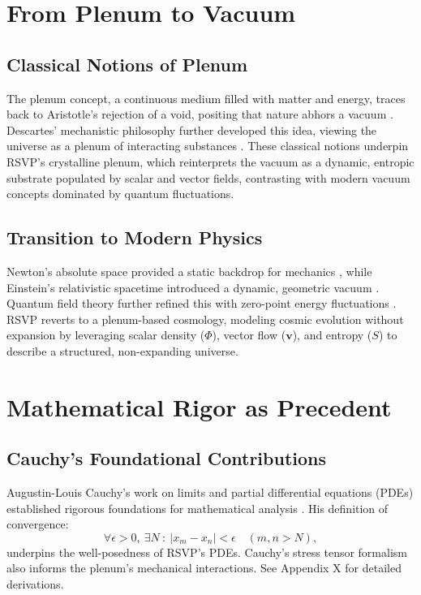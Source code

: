 \documentclass[12pt]{report}
\newcommand{\PhiRSVP}{\Phi}
\newcommand{\vRSVP}{\mathbf{v}}
\newcommand{\SRSVP}{S}
\begin{document}
\chapter{From Plenum to Vacuum}
\section{Classical Notions of Plenum}
The plenum concept, a continuous medium filled with matter and energy, traces back to Aristotle’s rejection of a void, positing that nature abhors a vacuum \citep{AristotlePhysics}. Descartes’ mechanistic philosophy further developed this idea, viewing the universe as a plenum of interacting substances \citep{Descartes1644}. These classical notions underpin RSVP’s crystalline plenum, which reinterprets the vacuum as a dynamic, entropic substrate populated by scalar and vector fields, contrasting with modern vacuum concepts dominated by quantum fluctuations.

\section{Transition to Modern Physics}
Newton’s absolute space provided a static backdrop for mechanics \citep{Newton1687}, while Einstein’s relativistic spacetime introduced a dynamic, geometric vacuum \citep{Einstein1915}. Quantum field theory further refined this with zero-point energy fluctuations \citep{Dirac1930}. RSVP reverts to a plenum-based cosmology, modeling cosmic evolution without expansion by leveraging scalar density (\(\PhiRSVP\)), vector flow (\(\vRSVP\)), and entropy (\(\SRSVP\)) to describe a structured, non-expanding universe.

\chapter{Mathematical Rigor as Precedent}
\section{Cauchy’s Foundational Contributions}
Augustin-Louis Cauchy’s work on limits and partial differential equations (PDEs) established rigorous foundations for mathematical analysis \citep{Cauchy1821}. His definition of convergence:
\begin{equation}
\forall \epsilon > 0, \ \exists N \ : \ |x_m - x_n| < \epsilon \quad (m, n > N), \label{eq:cauchy}
\end{equation}
underpins the well-posedness of RSVP’s PDEs. Cauchy’s stress tensor formalism also informs the plenum’s mechanical interactions. See Appendix X for detailed derivations.
\end{document}
